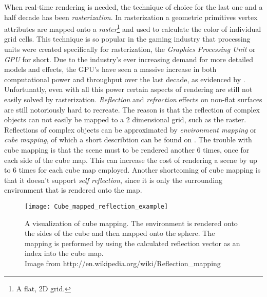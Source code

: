 When real-time rendering is needed, the technique of choice for the last one and
a half decade has been \textit{rasterization}. In rasterization a geometric
primitives vertex attributes are mapped onto a \textit{raster}\footnote{A flat,
  2D grid.} and used to calculate the color of individual grid cells. This
technique is so popular in the gaming industry that processing units were
created specifically for rasterization, the \textit{Graphics Processing Unit} or
\textit{GPU} for short. Due to the industry's ever increasing demand for more
detailed models and effects, the GPU's have seen a massive increase in both
computational power and throughput over the last decade, as evidenced by
. Unfortunatly, even with all this power certain
aspects of rendering are still not easily solved by
rasterization. \textit{Reflection} and \textit{refraction} effects on non-flat
surfaces are still notoriously hard to recreate. The reason is that the
reflection of complex objects can not easily be mapped to a 2 dimensional grid,
such as the raster. Reflections of complex objects can be approximated by
\textit{environment mapping} or \textit{cube mapping}, of which a short
describtion can be found on . The trouble with cube mapping
is that the scene must to be rendered another 6 times, once for each side of the
cube map. This can increase the cost of rendering a scene by up to 6 times for
each cube map employed. Another shortcoming of cube mapping is that it doesn't
support \textit{self reflection}, since it is only the surrounding environment
that is rendered onto the map.


\begin{figure}
  \centering
  \texttt{[image: Cube\_mapped\_reflection\_example]}

  \vspace{3mm}
  \parbox{9.5cm}{\caption[Cube mapping visualized.]{A visualization of cube
      mapping. The environment is rendered onto the sides of the cube and then
      mapped onto the sphere. The mapping is performed by using the calculated
      reflection vector as an index into the cube map.\\Image from
      http://en.wikipedia.org/wiki/Reflection\_mapping}\label{fig:cubemap}}
\end{figure}


